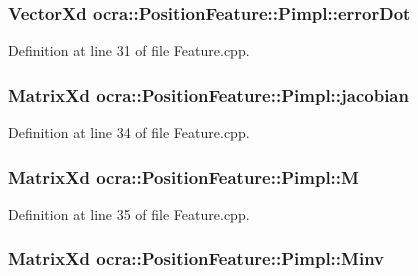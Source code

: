 \subsubsection[{\texorpdfstring{error\+Dot}{errorDot}}]{\setlength{\rightskip}{0pt plus 5cm}Vector\+Xd ocra\+::\+Position\+Feature\+::\+Pimpl\+::error\+Dot}\hypertarget{structocra_1_1PositionFeature_1_1Pimpl_a3bff7b8d61a5575a68503d6767478950}{}\label{structocra_1_1PositionFeature_1_1Pimpl_a3bff7b8d61a5575a68503d6767478950}


Definition at line 31 of file Feature.\+cpp.

\subsubsection[{\texorpdfstring{jacobian}{jacobian}}]{\setlength{\rightskip}{0pt plus 5cm}Matrix\+Xd ocra\+::\+Position\+Feature\+::\+Pimpl\+::jacobian}\hypertarget{structocra_1_1PositionFeature_1_1Pimpl_a9cd18a0039e2ebbce05d78403667dd02}{}\label{structocra_1_1PositionFeature_1_1Pimpl_a9cd18a0039e2ebbce05d78403667dd02}


Definition at line 34 of file Feature.\+cpp.

\subsubsection[{\texorpdfstring{M}{M}}]{\setlength{\rightskip}{0pt plus 5cm}Matrix\+Xd ocra\+::\+Position\+Feature\+::\+Pimpl\+::M}\hypertarget{structocra_1_1PositionFeature_1_1Pimpl_aa061dcd02d8f11de5edd55e8f2535bfe}{}\label{structocra_1_1PositionFeature_1_1Pimpl_aa061dcd02d8f11de5edd55e8f2535bfe}


Definition at line 35 of file Feature.\+cpp.

\subsubsection[{\texorpdfstring{Minv}{Minv}}]{\setlength{\rightskip}{0pt plus 5cm}Matrix\+Xd ocra\+::\+Position\+Feature\+::\+Pimpl\+::\+Minv}\hypertarget{structocra_1_1PositionFeature_1_1Pimpl_a7f6b8df16f7f9cbbe8e917e3ed4811eb}{}\label{structocra_1_1PositionFeature_1_1Pimpl_a7f6b8df16f7f9cbbe8e917e3ed4811eb}


